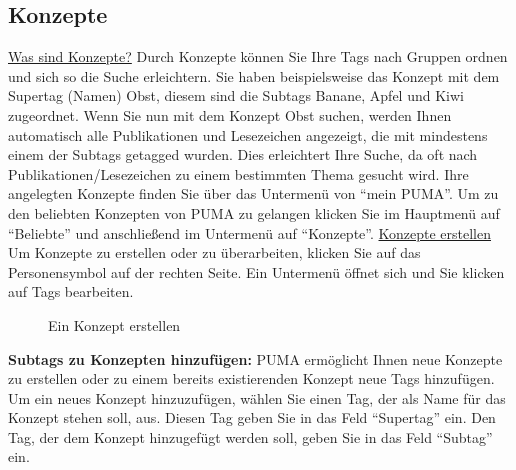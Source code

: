 \begin{description}
\subsection{Konzepte}
\underline{Was sind Konzepte?}
\newline
Durch Konzepte können Sie Ihre Tags nach Gruppen ordnen und sich so die Suche erleichtern. Sie haben beispielsweise das Konzept mit dem Supertag (Namen) Obst, diesem sind die Subtags Banane, Apfel und Kiwi zugeordnet. Wenn Sie nun mit dem Konzept Obst suchen, werden Ihnen automatisch alle Publikationen und Lesezeichen angezeigt, die mit mindestens einem der Subtags getagged wurden. Dies erleichtert Ihre Suche, da oft nach Publikationen/Lesezeichen zu einem bestimmten Thema gesucht wird. 
\newline Ihre angelegten Konzepte finden Sie über das Untermenü von \enquote{mein PUMA}. Um zu den beliebten Konzepten von PUMA zu gelangen klicken Sie im Hauptmenü auf \enquote{Beliebte} und anschließend im Untermenü auf \enquote{Konzepte}. 
\newline
\newline
\underline{Konzepte erstellen}
\newline
Um Konzepte zu erstellen oder zu überarbeiten, klicken Sie auf das Personensymbol auf der rechten Seite. Ein Untermenü öffnet sich und Sie klicken auf Tags bearbeiten. 
\begin{figure}[h!]
 \centering
 \caption{Ein Konzept erstellen}
 \label{figure027}
\end{figure}
\textbf{Subtags zu Konzepten hinzufügen:} PUMA ermöglicht Ihnen neue Konzepte zu erstellen oder zu einem bereits existierenden Konzept neue Tags hinzufügen. Um ein neues Konzept hinzuzufügen, wählen Sie einen Tag, der als Name für das Konzept stehen soll, aus. Diesen Tag geben Sie in das Feld \enquote{Supertag} ein. Den Tag, der dem Konzept hinzugefügt werden soll, geben Sie in das Feld \enquote{Subtag} ein.

\end{description}
